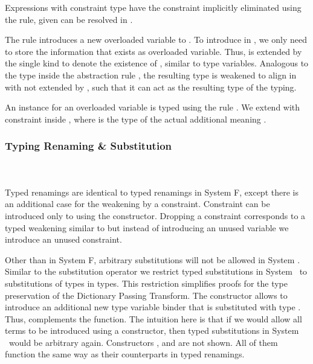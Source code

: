 \noindent Expressions  with constraint type \Constr{[}  \Constr{]⇒}  have the constraint implicitly eliminated using the  rule, given  can be resolved in . 

\noindent The rule  introduces a new overloaded variable  to . 
To introduce  in , we only need to store the information that  exists as overloaded variable. Thus,  is extended by the single kind  to denote the existence of , similar to type variables. 
Analogous to the type  inside the abstraction rule , the resulting type  is weakened to align in  with  not extended by , such that it can act as the resulting type of the typing.

\noindent An instance for an overloaded variable  is typed using the rule . We extend  with constraint  \Constr{:}  inside , where  is the type of the actual additional meaning . 

\subsubsection{Typing Renaming \& Substitution}\hfill\\\\
Typed renamings are identical to typed renamings in System F, except there is an additional case for the weakening by a constraint. 
\FoRenTyping
Constraint  \Constr{:}  can be introduced only to  using the  constructor. 
Dropping a constraint corresponds to a typed weakening similar to  but instead of introducing an unused variable we introduce an unused constraint.

\noindent Other than in System F, arbitrary substitutions will not be allowed in System \Fo. 
Similar to the substitution operator we restrict typed substitutions in System \Fo\ to substitutions of types in types. This restriction simplifies proofs for the type preservation of the Dictionary Passing Transform.
\FoSubTyping
\noindent The constructor  allows to introduce an additional new type variable binder that is substituted with type .
Thus,  complements the  function. The intuition here is that if we would allow all terms to be introduced using a  constructor, then typed substitutions in System \Fo\ would be arbitrary again.
Constructors ,  and are not shown. All of them function the same way as their counterparts in typed renamings.
